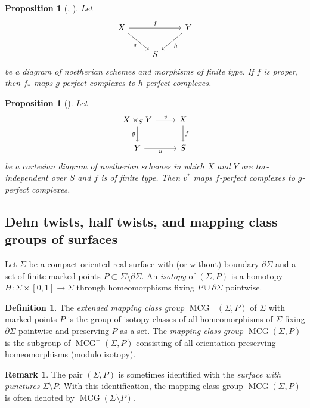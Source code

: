 \documentclass{amsart}
\numberwithin{equation}{section}
\theoremstyle{plain}
\newtheorem{proposition}[theorem]{Proposition}
\theoremstyle{definition}
\newtheorem{definition}[theorem]{Definition}
\newtheorem{remark}[theorem]{Remark}
\DeclareMathOperator{\MCG}{\mathrm{MCG}}
\begin{document}
\begin{proposition}[{\cite[Proposition 2.7]{MR3720794}, \cite[Proposition 3.5]{MR4604981}}]\label{prop:proper-push-forward-of-f-perfect}
    Let
    \[
        \begin{tikzcd}
            X \ar[rr, "f"] \ar[rd, "g"']& & Y \ar[ld, "h"]\\
            & S &
        \end{tikzcd}
    \]
    be a diagram of noetherian schemes and morphisms of finite type.
    If $f$ is proper, then $f_*$ maps $g$-perfect complexes to $h$-perfect complexes.
\end{proposition}
\begin{proposition}[{\cite[Proposition 3.11]{MR4604981}}]
    Let
    \[
        \begin{tikzcd}
            X \times_S Y \arrow[r,"v"]\arrow[d, "g"'] & X \arrow[d,"f"]\\
            Y \arrow[r, "u"']& S
        \end{tikzcd}
    \]
    be a cartesian diagram of noetherian schemes in which $X$ and $Y$ are tor-independent over $S$ and $f$ is of finite type.
    Then $v^*$ maps $f$-perfect complexes to $g$-perfect complexes.
\end{proposition}



\subsection{Dehn twists, half twists, and mapping class groups of surfaces}\label{subsection:Dehn-twists-and-mapping-class-groups}
Let $\Sigma$ be a compact oriented real surface with (or without) boundary $\partial \Sigma$
and a set of finite marked points $P \subset \Sigma \setminus \partial \Sigma$.
An \emph{isotopy} of $(\Sigma, P)$ is
a homotopy $H \colon \Sigma \times [0, 1] \to \Sigma$ through homeomorphisms fixing $P \cup \partial \Sigma$ pointwise.

\begin{definition}
    The \emph{extended mapping class group} $\MCG^{\pm}(\Sigma, P)$ of $\Sigma$ with marked points $P$ is
    the group of isotopy classes of all homeomorphisms of $\Sigma$
    fixing $\partial \Sigma$ pointwise
    and preserving $P$ as a set.
    The \emph{mapping class group} $\MCG(\Sigma, P)$ is
    the subgroup of $\MCG^{\pm}(\Sigma, P)$ consisting of all orientation-preserving homeomorphisms (modulo isotopy).
\end{definition}
\begin{remark}
    The pair $(\Sigma, P)$ is sometimes identified with the \emph{surface with punctures} $\Sigma \setminus P$.
    With this identification, the mapping class group $\MCG(\Sigma, P)$ is often denoted by $\MCG(\Sigma \setminus P)$.
\end{remark}
\end{document}

